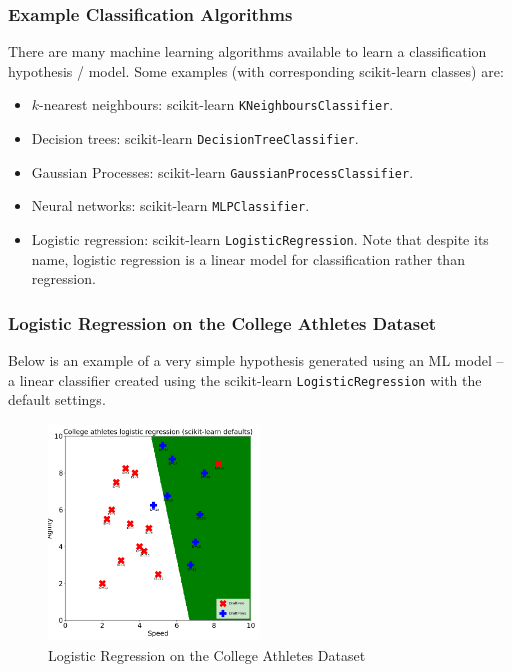 \documentclass[a4paper,11pt]{article}
\begin{document}
\subsubsection{Example Classification Algorithms}
There are many machine learning algorithms available to learn a classification hypothesis / model.
Some examples (with corresponding scikit-learn classes) are:
\begin{itemize}
    \item   $k$-nearest neighbours: scikit-learn \verb|KNeighboursClassifier|.
    \item   Decision trees: scikit-learn \verb|DecisionTreeClassifier|.
    \item   Gaussian Processes: scikit-learn \verb|GaussianProcessClassifier|.
    \item   Neural networks: scikit-learn \verb|MLPClassifier|.
    \item   Logistic regression: scikit-learn \verb|LogisticRegression|.
            Note that despite its name, logistic regression is a linear model for classification rather than regression.
\end{itemize}

\subsubsection{Logistic Regression on the College Athletes Dataset}
Below is an example of a very simple hypothesis generated using an ML model -- a linear classifier created using the
scikit-learn \verb|LogisticRegression| with the default settings.

\begin{figure}[H]
    \centering
    \includegraphics[width=0.5\textwidth]{./images/logistic_regression_college_athletes.png}
    \caption{Logistic Regression on the College Athletes Dataset}
\end{figure}
\end{document}
